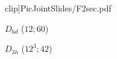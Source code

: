 \documentclass{beamer}
\begin{document}
\begin{frame}
\begin{center}
\begin{minipage}[b]{24mm}
{clip]{PicJointSlides/F2sec.pdf}}\par
 $D_{6d}$ ($12;60$)
\end{minipage}
\begin{minipage}[b]{24mm}
\centering
{}\par
 $D_{3h}$ ($12^3;42$)
\end{minipage}
\begin{minipage}[b]{24mm}
\centering
\resizebox{20mm}{!}{\includegraphics[bb=1 1 439 380,
}
\end{minipage}
\end{center}
\end{frame}
\end{document}
